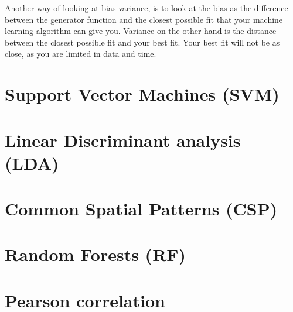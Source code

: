 
Another way of looking at bias variance, is to look at the bias as the difference between the generator function and the closest possible fit that your machine learning algorithm can give you. Variance on the other hand is the distance between the closest possible fit and your best fit. Your best fit will not be as close, as you are limited in data and time.

\section{Support Vector Machines (SVM)}


\section{Linear Discriminant analysis (LDA)}


\section{Common Spatial Patterns (CSP)}


\section{Random Forests (RF)}

\section{Pearson correlation}
